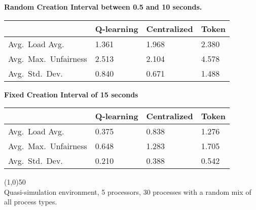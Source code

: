 \documentclass{slides}
\newcommand{\algtbl}[6]{

\begin{center}
\textbf{#1}
\end{center}

\begin{tabularx}{\linewidth}{|X|X|X|X|} \hline
	& \textbf{Q-learning} & \textbf{Centralized} & \textbf{Token} \\ \hline
	#2
\end{tabularx}

\begin{center}
\textbf{#3}
\end{center}

\begin{tabularx}{\linewidth}{|X|X|X|X|} \hline
	& \textbf{Q-learning} & \textbf{Centralized} & \textbf{Token} \\ \hline
	#4
\end{tabularx}

\vspace{1em}
\line(1,0){50} \\
#5
}
\begin{document}
\landscape

\algtbl{Random Creation Interval between 0.5 and 10 seconds.}
{	Avg.\ Load Avg.\ & 1.361 & 1.968 & 2.380 \\ \hline
	Avg.\ Max.\ Unfairness & 2.513 & 2.104 & 4.578 \\ \hline
	Avg.\ Std.\ Dev.\ & 0.840 & 0.671 & 1.488 \\ \hline}
{Fixed Creation Interval of 15 seconds}
{	Avg.\ Load Avg.\ & 0.375 & 0.838 & 1.276 \\ \hline
	Avg.\ Max.\ Unfairness & 0.648 & 1.283 & 1.705 \\ \hline
	Avg.\ Std.\ Dev.\ & 0.210 & 0.388 & 0.542 \\ \hline}
{Quasi-simulation environment, 5 processors, 30 processes with a random mix
of all process types.}
{Comparison of Process Creation Interval}
\end{document}
